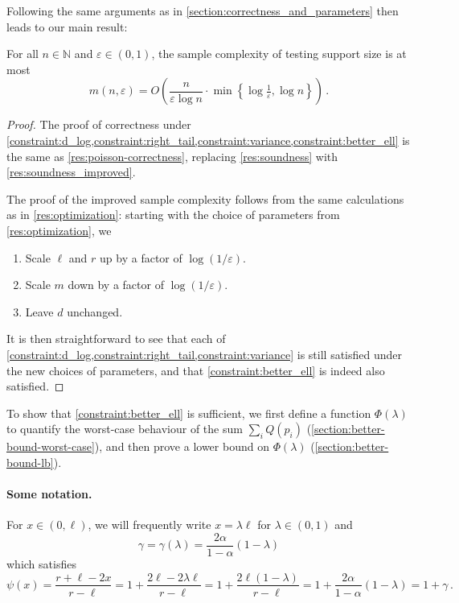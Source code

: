 \documentclass{theoretics}
\newcommand{\bN}{\ensuremath{\mathbb{N}}}
\renewcommand{\epsilon}{\varepsilon}
\begin{document}
Following the same arguments as in \cref{section:correctness_and_parameters} then leads to our main
result:
\begin{theorem}
\label{thm:formal-main}
For all $n \in \bN$ and $\epsilon \in (0,1)$, the sample complexity of testing support size is
at most
\[
  m(n,\epsilon) = O\left(\frac{n}{\epsilon \log n} \cdot \min\left\{ \log\tfrac{1}{\epsilon}, \log
n\right\} \right) \,.
\]
\end{theorem}
\begin{proof}
    The proof of correctness under
    \cref{constraint:d_log,constraint:right_tail,constraint:variance,constraint:better_ell} is the
    same as \cref{res:poisson-correctness}, replacing \cref{res:soundness} with
    \cref{res:soundness_improved}.

    The proof of the improved sample complexity follows from the same calculations as in
    \cref{res:optimization}: starting with the choice of parameters from \cref{res:optimization}, we
    \begin{enumerate}
        \item Scale $\ell$ and $r$ up by a factor of $\log(1/\epsilon)$.
        \item Scale $m$ down by a factor of $\log(1/\epsilon)$.
        \item Leave $d$ unchanged.
    \end{enumerate}
    It is then straightforward to see that each of
    \cref{constraint:d_log,constraint:right_tail,constraint:variance} is still satisfied under the
    new choices of parameters, and that \cref{constraint:better_ell} is indeed also satisfied.
\end{proof}


To show that \cref{constraint:better_ell} is sufficient, we first define a function $\Phi(\lambda)$
to quantify the worst-case behaviour of the sum $\sum_i Q(p_i)$
(\cref{section:better-bound-worst-case}), and then prove a lower bound on $\Phi(\lambda)$
(\cref{section:better-bound-lb}).

\paragraph*{Some notation.}
For $x \in (0,\ell)$, we will frequently write $x = \lambda \ell$
for $\lambda \in (0,1)$ and
\[
  \gamma = \gamma(\lambda) = \frac{2\alpha}{1-\alpha}(1-\lambda)
\]
which satisfies
\begin{equation}
\label{eq:psi-gamma}
  \psi(x) = \frac{r+\ell-2x}{r-\ell} = 1 + \frac{2\ell-2\lambda\ell}{r-\ell} = 1 +
\frac{2\ell(1-\lambda)}{r-\ell} = 1 + \frac{2\alpha}{1-\alpha}(1-\lambda) = 1 + \gamma \,.
\end{equation}
\end{document}
